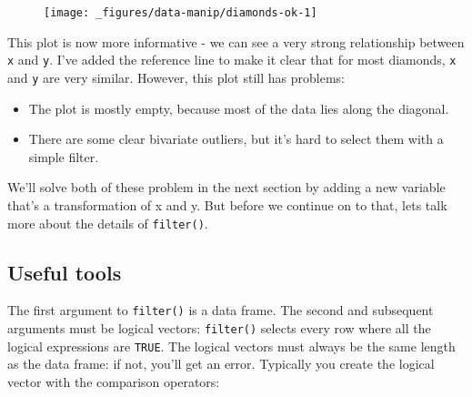 \begin{Shaded}
\begin{Highlighting}[]
\StringTok{ }\StringTok{ }\StringTok{ }\StringTok{ }\NormalTok{)}
\StringTok{  }\NormalTok{() +}
\StringTok{  }\NormalTok{(} \NormalTok{, } \NormalTok{, } \NormalTok{, } \NormalTok{)}
\end{Highlighting}
\end{Shaded}

\begin{figure}[H]
  \centering
  \texttt{[image: \_figures/data-manip/diamonds-ok-1]}
\end{figure}

This plot is now more informative - we can see a very strong
relationship between \texttt{x} and \texttt{y}. I've added the reference
line to make it clear that for most diamonds, \texttt{x} and \texttt{y}
are very similar. However, this plot still has problems:

\begin{itemize}
\item
  The plot is mostly empty, because most of the data lies along the
  diagonal.
\item
  There are some clear bivariate outliers, but it's hard to select them
  with a simple filter.
\end{itemize}

We'll solve both of these problem in the next section by adding a new
variable that's a transformation of x and y. But before we continue on
to that, lets talk more about the details of \texttt{filter()}.

\subsection{Useful tools}

The first argument to \texttt{filter()} is a data frame. The second and
subsequent arguments must be logical vectors: \texttt{filter()} selects
every row where all the logical expressions are \texttt{TRUE}. The
logical vectors must always be the same length as the data frame: if
not, you'll get an error. Typically you create the logical vector with
the comparison operators:

